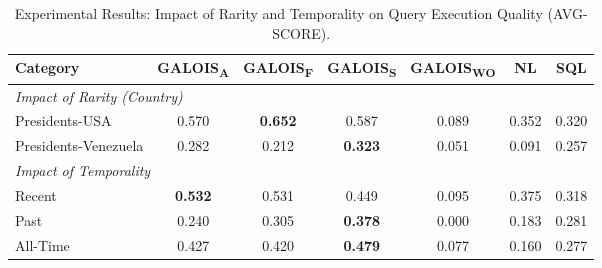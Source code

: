 \begin{table}[ht]
    \centering
    \caption{Experimental Results: Impact of Rarity and Temporality on Query Execution Quality (AVG-SCORE).}
    \label{tab:combined_results}
    \begin{tabular}{lcccccc}
        \toprule
        \textbf{Category} & \textbf{GALOIS\textsubscript{A}} & \textbf{GALOIS\textsubscript{F}} & \textbf{GALOIS\textsubscript{S}} & \textbf{GALOIS\textsubscript{WO}} & \textbf{NL} & \textbf{SQL} \\
        \midrule
        \multicolumn{7}{l}{\textit{Impact of Rarity (Country)}} \\
        \midrule
        Presidents-USA & 0.570 & \textbf{0.652} & 0.587 & 0.089 & 0.352 & 0.320 \\
        Presidents-Venezuela & 0.282 & 0.212 & \textbf{0.323} & 0.051 & 0.091 & 0.257 \\
        \midrule
        \multicolumn{7}{l}{\textit{Impact of Temporality}} \\
        \midrule
        Recent & \textbf{0.532} & 0.531 & 0.449 & 0.095 & 0.375 & 0.318 \\
        Past & 0.240 & 0.305 & \textbf{0.378} & 0.000 & 0.183 & 0.281 \\
        All-Time & 0.427 & 0.420 & \textbf{0.479} & 0.077 & 0.160 & 0.277 \\
        \bottomrule
    \end{tabular}
\end{table}



